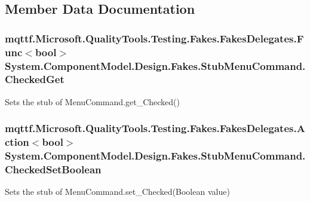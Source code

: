 \subsection{Member Data Documentation}
\hypertarget{class_system_1_1_component_model_1_1_design_1_1_fakes_1_1_stub_menu_command_a709b02fc2fab79e3eb94a5979f67a788}{
\subsubsection[{Checked\-Get}]{\setlength{\rightskip}{0pt plus 5cm}mqttf.\-Microsoft.\-Quality\-Tools.\-Testing.\-Fakes.\-Fakes\-Delegates.\-Func$<$bool$>$ System.\-Component\-Model.\-Design.\-Fakes.\-Stub\-Menu\-Command.\-Checked\-Get}}\label{class_system_1_1_component_model_1_1_design_1_1_fakes_1_1_stub_menu_command_a709b02fc2fab79e3eb94a5979f67a788}


Sets the stub of Menu\-Command.\-get\-\_\-\-Checked()

\hypertarget{class_system_1_1_component_model_1_1_design_1_1_fakes_1_1_stub_menu_command_a3a28162a41ef9385de1778f1ac230881}{
\subsubsection[{Checked\-Set\-Boolean}]{\setlength{\rightskip}{0pt plus 5cm}mqttf.\-Microsoft.\-Quality\-Tools.\-Testing.\-Fakes.\-Fakes\-Delegates.\-Action$<$bool$>$ System.\-Component\-Model.\-Design.\-Fakes.\-Stub\-Menu\-Command.\-Checked\-Set\-Boolean}}\label{class_system_1_1_component_model_1_1_design_1_1_fakes_1_1_stub_menu_command_a3a28162a41ef9385de1778f1ac230881}


Sets the stub of Menu\-Command.\-set\-\_\-\-Checked(\-Boolean value)

